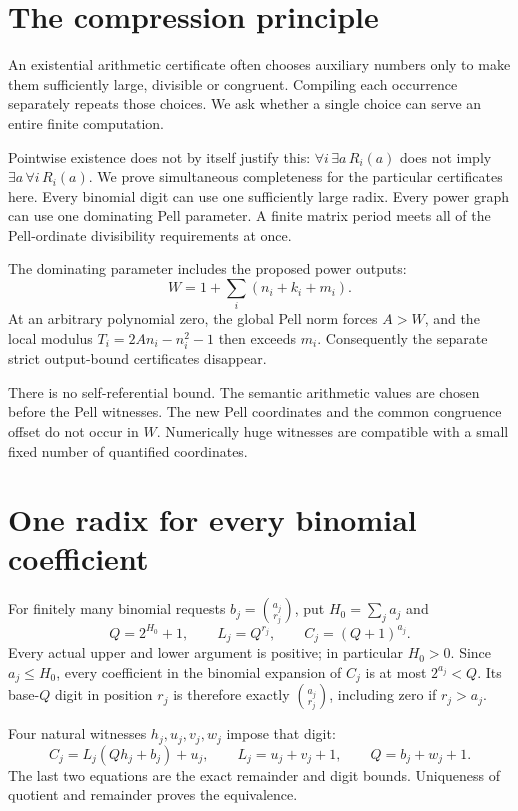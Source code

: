 \documentclass[11pt,letterpaper]{article}
\begin{document}
\section{The compression principle}
\label{sec:principle}

An existential arithmetic certificate often chooses auxiliary numbers
only to make them sufficiently large, divisible or congruent. Compiling
each occurrence separately repeats those choices. We ask whether a
single choice can serve an entire finite computation.

Pointwise existence does not by itself justify this:
$\forall i\,\exists a\,R_i(a)$ does not imply
$\exists a\,\forall i\,R_i(a)$. We prove simultaneous completeness
for the particular certificates here. Every binomial digit can use
one sufficiently large radix. Every power graph can use one
dominating Pell parameter. A finite matrix period meets all of the
Pell-ordinate divisibility requirements at once.

The dominating parameter includes the proposed power outputs:
\[
 W=1+\sum_i(n_i+k_i+m_i).
\]
At an arbitrary polynomial zero, the global Pell norm forces
$A>W$, and the local modulus $T_i=2An_i-n_i^2-1$ then exceeds
$m_i$. Consequently the separate strict output-bound
certificates disappear.

There is no self-referential bound. The semantic arithmetic
values are chosen before the Pell witnesses. The new Pell
coordinates and the common congruence offset do not occur in
$W$. Numerically huge witnesses are compatible with a small
fixed number of quantified coordinates.

\section{One radix for every binomial coefficient}
\label{sec:radix}

For finitely many binomial requests $b_j=\binom{a_j}{r_j}$,
put $H_0=\sum_j a_j$ and
\[
 Q=2^{H_0}+1,\qquad L_j=Q^{r_j},\qquad C_j=(Q+1)^{a_j}.
\]
Every actual upper and lower argument is positive; in
particular $H_0>0$. Since $a_j\le H_0$, every coefficient
in the binomial expansion of $C_j$ is at most $2^{a_j}<Q$.
Its base-$Q$ digit in position $r_j$ is therefore exactly
$\binom{a_j}{r_j}$, including zero if $r_j>a_j$.

Four natural witnesses $h_j,u_j,v_j,w_j$ impose that digit:
\begin{equation}
 C_j=L_j(Qh_j+b_j)+u_j,\qquad
 L_j=u_j+v_j+1,\qquad Q=b_j+w_j+1.
\label{eq:shared-digit}
\end{equation}
The last two equations are the exact remainder and digit
bounds. Uniqueness of quotient and remainder proves the
equivalence.
\end{document}

